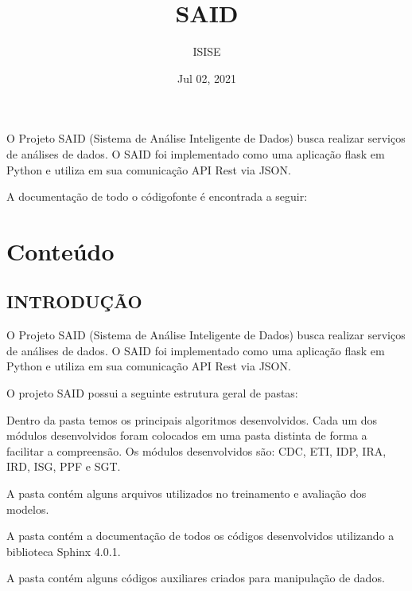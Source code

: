 \documentclass[letterpaper,10pt,english]{sphinxmanual}
\title{SAID}
\date{Jul 02, 2021}
\author{ISI\sphinxhyphen{}SE}
\begin{document}
\pagestyle{empty}
\sphinxmaketitle
\pagestyle{plain}
\sphinxtableofcontents
\pagestyle{normal}
\label{\detokenize{index::doc}}



\sphinxAtStartPar
O Projeto SAID (Sistema de Análise Inteligente de Dados) busca realizar serviços
de análises de dados. O SAID foi implementado como uma aplicação flask em Python
e utiliza em sua comunicação API Rest via JSON.

\sphinxAtStartPar
A documentação de todo o código\sphinxhyphen{}fonte é encontrada a seguir:


\chapter{Conteúdo}
\label{\detokenize{index:conteudo}}

\section{INTRODUÇÃO}
\label{\detokenize{introduction:introducao}}\label{\detokenize{introduction::doc}}
\sphinxAtStartPar
O Projeto SAID (Sistema de Análise Inteligente de Dados) busca realizar serviços
de análises de dados. O SAID foi implementado como uma aplicação flask em Python
e utiliza em sua comunicação API Rest via JSON.

\sphinxAtStartPar
O projeto SAID possui a seguinte estrutura geral de pastas:


\sphinxAtStartPar
Dentro da pasta  temos os principais algoritmos desenvolvidos. Cada um
dos módulos desenvolvidos foram colocados em uma pasta distinta de forma a facilitar
a compreensão. Os módulos desenvolvidos são: CDC, ETI, IDP, IRA, IRD, ISG, PPF e SGT.

\sphinxAtStartPar
A pasta  contém alguns arquivos utilizados no treinamento e avaliação dos
modelos.

\sphinxAtStartPar
A pasta  contém a documentação de todos os códigos desenvolvidos utilizando a
biblioteca Sphinx 4.0.1.

\sphinxAtStartPar
A pasta  contém alguns códigos auxiliares criados para manipulação de dados.
\end{document}
